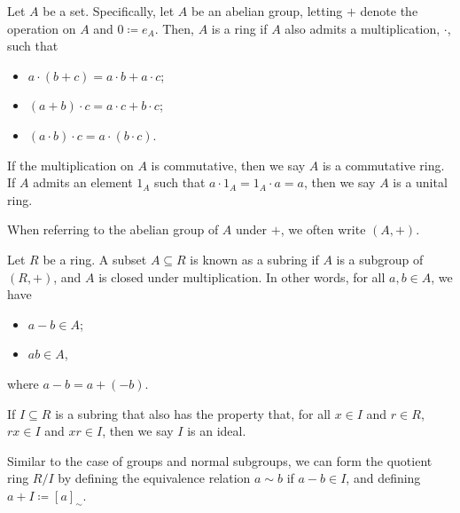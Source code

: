 \begin{definition}[Rings]
  Let $A$ be a set. Specifically, let $A$ be an abelian group, letting $+$ denote the operation on $A$ and $0\coloneq e_A$. Then, $A$ is a ring if $A$ also admits a multiplication, $\cdot$, such that
  \begin{itemize}
    \item $a\cdot \left(b+c\right) = a\cdot b + a\cdot c$;
    \item $\left(a+b\right)\cdot c = a\cdot c + b\cdot c$;
    \item $\left(a\cdot b\right)\cdot c = a\cdot \left(b\cdot c\right)$.
  \end{itemize}
  If the multiplication on $A$ is commutative, then we say $A$ is a commutative ring. If $A$ admits an element $1_A$ such that $a\cdot 1_A = 1_A \cdot a = a$, then we say $A$ is a unital ring.\newline

  When referring to the abelian group of $A$ under $+$, we often write $\left(A,+\right)$.
\end{definition}
\begin{definition}
  Let $R$ be a ring. A subset $A\subseteq R$ is known as a subring if $A$ is a subgroup of $\left(R,+\right)$, and $A$ is closed under multiplication. In other words, for all $a,b\in A$, we have
  \begin{itemize}
    \item $a-b\in A$;
    \item $ab \in A$,
  \end{itemize}
  where $a-b = a + (-b)$.\newline

  If $I\subseteq R$ is a subring that also has the property that, for all $x\in I$ and $r\in R$, $rx\in I$ and $xr\in I$, then we say $I$ is an ideal.\newline

  Similar to the case of groups and normal subgroups, we can form the quotient ring $R/I$ by defining the equivalence relation $a\sim b$ if $a-b\in I$, and defining $a + I\coloneq \left[a\right]_{\sim}$.
\end{definition}
